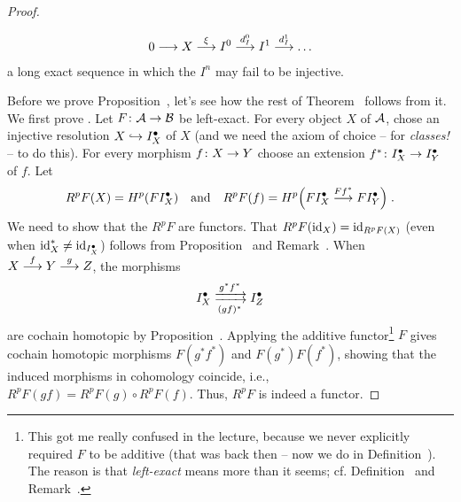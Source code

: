 \documentclass[a4paper,parskip=half,numbers=enddot, DIV=12]{scrreprt}
\begin{document}
\begin{proof}
\begin{rem}
\begin{alphanumerate}
\begin{align*}
					0\morphism X\morphism[\xi]I^0\morphism[d_I^0]I^1\morphism[d_I^1]\ldots 
				\end{align*}
				a long exact sequence in which the $I^n$ may fail to be injective. 
			\end{alphanumerate}
		\end{rem}
		Before we prove Proposition~, let's see how the rest of Theorem~ follows from it. We first prove . Let $F\colon\Aa\morphism \Bb$ be left-exact. For every object $X$ of $\mathcal{A}$, chose an injective resolution $X\monomorphism I_X^\bullet $ of $X$ (and we need the axiom of choice -- for \emph{classes!} -- to do this). For every morphism $f\colon X\morphism Y$ choose an extension $f^*\colon I_X^\bullet \morphism I_Y^\bullet $ of $f$. Let
		\begin{align*}
			R^pF(X)=H^p(FI_X^\bullet )\quad\text{and}\quad R^pF(f)=H^p\Big(FI_X^\bullet \morphism[Ff^* ]FI_Y^\bullet \Big)\;.
		\end{align*}
		We need to show that the $R^pF$ are functors. That $R^pF(\operatorname{id}_X)=\operatorname{id}_{R^pF(X)}$ (even when $\operatorname{id}_X^* \neq \operatorname{id}_{I_X^\bullet }$) follows from Proposition~ and Remark~. When $X\morphism[f]Y\morphism[g]Z$, the morphisms 
		\begin{align*}
			I_X^\bullet \xdoublemorphism[g^* f^* ][(gf)^* ]I_Z^\bullet 
		\end{align*}
		are cochain homotopic by Proposition~. Applying the additive functor\footnote{This got me really confused in the lecture, because we never explicitly required $F$ to be additive (that was back then -- now we do in Definition~). The reason is that \emph{left-exact} means more than it seems; cf. Definition~ and Remark~.} $F$ gives cochain homotopic morphisms $F(g^* f^* )$ and $F(g^* )F(f^*)$, showing that the induced morphisms in cohomology coincide, i.e., $R^pF(gf)=R^pF(g)\circ R^pF(f)$. Thus, $R^pF$ is indeed a functor.
		

\end{proof}
\end{document}
